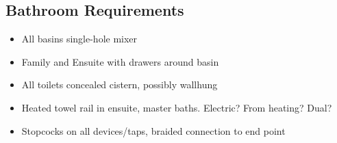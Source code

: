 \subsection{Bathroom Requirements}
\begin{itemize}
\item All basins single-hole mixer
\item Family and Ensuite with drawers around basin
\item All toilets concealed cistern, possibly wallhung
\item Heated towel rail in ensuite, master baths. Electric? From heating? Dual?
\item Stopcocks on all devices/taps, braided connection to end point    
\end{itemize}
